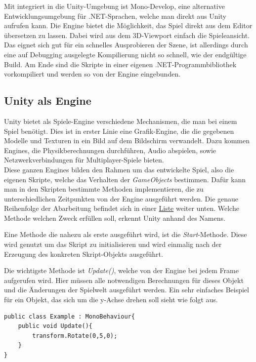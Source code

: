 Mit integriert in die Unity-Umgebung ist Mono-Develop, eine alternative Entwicklungsumgebung für .NET-Sprachen, welche man direkt aus Unity aufrufen kann. Die Engine bietet die Möglichkeit, das Spiel direkt aus dem Editor übersetzen zu lassen. Dabei wird aus dem 3D-Viewport einfach die Spieleansicht. Das eignet sich gut für ein schnelles Ausprobieren der Szene, ist allerdings durch eine auf Debugging ausgelegte Kompilierung nicht so schnell, wie der endgültige Build. Am Ende sind die Skripte in einer eigenen .NET-Programmbibliothek vorkompiliert und werden so von der Engine eingebunden.

\subsection{Unity als Engine}

Unity bietet als Spiele-Engine verschiedene Mechanismen, die man bei einem Spiel benötigt. Dies ist in erster Linie eine Grafik-Engine, die die gegebenen Modelle und Texturen in ein Bild auf dem Bildschirm verwandelt. Dazu kommen Engines, die Physikberechnungen durchführen, Audio abspielen, sowie Netzwerkverbindungen für Multiplayer-Spiele bieten.\\
Diese ganzen Engines bilden den Rahmen um das entwickelte Spiel, also die eigenen Skripte, welche das Verhalten der \textit{GameObjects} bestimmen. Dafür kann man in den Skripten bestimmte Methoden implementieren, die zu unterschiedlichen Zeitpunkten von der Engine ausgeführt werden. Die genaue Reihenfolge der Abarbeitung befindet sich in einer \hyperlink{MainLoopOrder}{Liste} weiter unten. Welche Methode welchen Zweck erfüllen soll, erkennt Unity anhand des Namens. 

Eine Methode die nahezu als erste ausgeführt wird, ist die \textit{Start}-Methode. Diese wird genutzt um das Skript zu initialisieren und wird einmalig nach der Erzeugung des konkreten Skript-Objekts ausgeführt.

Die wichtigste Methode ist \textit{Update()}, welche von der Engine bei jedem Frame aufgerufen wird. Hier müssen alle notwendigen Berechnungen für dieses Objekt und die Änderungen der Spielwelt ausgeführt werden.
Ein sehr einfaches Beispiel für ein Objekt, das sich um die y-Achse drehen soll sieht wie folgt aus.\\

\begin{lstlisting}[caption={[Einfache Skript-Klasse mit Update-Methode]Einfache Skript-Klasse mit Update-Methode}]
public class Example : MonoBehaviour{
	public void Update(){
		transform.Rotate(0,5,0);
	}
}
\end{lstlisting}

